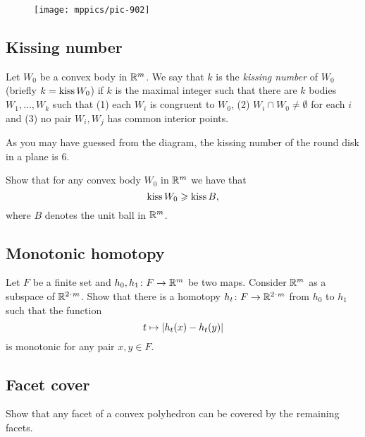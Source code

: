 {


\begin{wrapfigure}{r}{27 mm}
\vskip0mm
\centering
\texttt{[image: mppics/pic-902]}
\end{wrapfigure}

\subsection*{Kissing number\easy}\label{pr:Kissing number}


Let  $W_0$ be a convex body in $\RR^m$.
We say that $k$ is the \emph{kissing number} of $W_0$ (briefly $k=\mathop{\rm kiss}W_0$)
if $k$ is the maximal integer such that there are $k$ bodies $W_1,\dots,W_k$ such that 
(1) each $W_i$ is congruent to $W_0$,
(2) $W_i\cap W_0\not=\emptyset$ for each $i$ 
and (3) no pair $W_i,W_j$ has common interior points.

}

As you may have guessed from the diagram, the kissing number of the round disk in a plane is $6$.

\begin{pr}
Show that for any convex body $W_0$ in $\RR^m$ we have that
$$\mathop{\rm kiss}W_0\ge \mathop{\rm kiss}B,$$
where $B$ denotes the unit ball in $\RR^m$.
\end{pr}

\subsection*{Monotonic homotopy}
\label{mono-homotopy}




\begin{pr}
Let $F$ be a finite set and $h_0,h_1\: F\to\RR^m$ be two maps.
Consider $\RR^m$ as a subspace of $\RR^{2\cdot m}$.
Show that there is a homotopy  $h_t\:F\z\to\RR^{2\cdot m}$ from $h_0$ to $h_1$ such that  the function 
\[t\z\mapsto |h_t(x)-h_t(y)|\] 
is monotonic for any pair $x,y\in F$.
\end{pr}

\subsection*{Facet cover}\label{Facet cover}

\begin{pr}
Show that any facet of a convex polyhedron can be covered by the remaining facets.
\end{pr}



